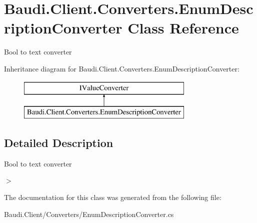 \hypertarget{class_baudi_1_1_client_1_1_converters_1_1_enum_description_converter}{}\section{Baudi.\+Client.\+Converters.\+Enum\+Description\+Converter Class Reference}
\label{class_baudi_1_1_client_1_1_converters_1_1_enum_description_converter}


Bool to text converter  


Inheritance diagram for Baudi.\+Client.\+Converters.\+Enum\+Description\+Converter\+:\begin{figure}[H]
\begin{center}
\leavevmode
\includegraphics[height=2.000000cm]{class_baudi_1_1_client_1_1_converters_1_1_enum_description_converter}
\end{center}
\end{figure}


\subsection{Detailed Description}
Bool to text converter 

$>$ 

The documentation for this class was generated from the following file\+:\begin{DoxyCompactItemize}
\item 
Baudi.\+Client/\+Converters/Enum\+Description\+Converter.\+cs\end{DoxyCompactItemize}

